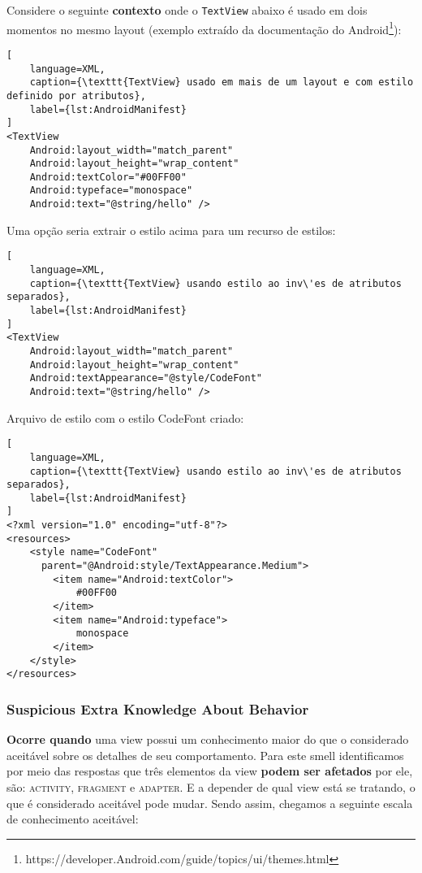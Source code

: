 Considere o seguinte \textbf{contexto} onde o \texttt{TextView} abaixo \'e usado em dois momentos no mesmo layout (exemplo extra\'ido da documenta\c{c}\~ao do Android\footnote{https://developer.Android.com/guide/topics/ui/themes.html}):

\begin{lstlisting}[
	language=XML, 
	caption={\texttt{TextView} usado em mais de um layout e com estilo definido por atributos}, 
	label={lst:AndroidManifest}
]
<TextView
    Android:layout_width="match_parent"
    Android:layout_height="wrap_content"
    Android:textColor="#00FF00"
    Android:typeface="monospace"
    Android:text="@string/hello" />
\end{lstlisting}

Uma op\c{c}\~ao seria extrair o estilo acima para um recurso de estilos:

\begin{lstlisting}[
	language=XML, 
	caption={\texttt{TextView} usando estilo ao inv\'es de atributos separados}, 
	label={lst:AndroidManifest}
]
<TextView
    Android:layout_width="match_parent"
    Android:layout_height="wrap_content"
    Android:textAppearance="@style/CodeFont"
    Android:text="@string/hello" />
\end{lstlisting}

Arquivo de estilo com o estilo CodeFont criado:

\begin{lstlisting}[
	language=XML, 
	caption={\texttt{TextView} usando estilo ao inv\'es de atributos separados}, 
	label={lst:AndroidManifest}
]
<?xml version="1.0" encoding="utf-8"?>
<resources>
    <style name="CodeFont" 
      parent="@Android:style/TextAppearance.Medium">
        <item name="Android:textColor">
        	#00FF00
        </item>
        <item name="Android:typeface">
        	monospace
        </item>
    </style>
</resources>
\end{lstlisting}


\subsubsection{Suspicious Extra Knowledge About Behavior}

\textbf{Ocorre quando} uma view possui um conhecimento maior do que o considerado aceit\'avel sobre os detalhes de seu comportamento. Para este smell identificamos por meio das respostas que três elementos da view \textbf{podem ser afetados} por ele, s\~ao: \textsc{activity}, \textsc{fragment} e \textsc{adapter}. E a depender de qual view est\'a se tratando, o que \'e considerado aceit\'avel pode mudar. Sendo assim, chegamos a seguinte escala de conhecimento aceit\'avel:

